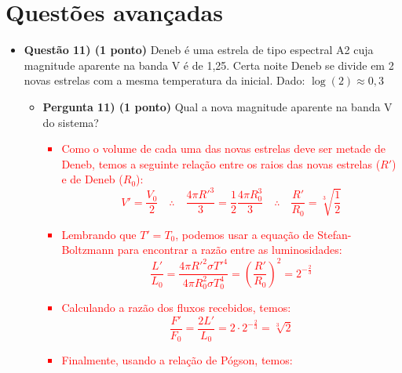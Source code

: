 \documentclass[a4paper, 12pt]{article}
\newcommand{\red}[1]{\textcolor{red}{#1}}
\begin{document}
    \section*{Questões avançadas}
        \begin{flushleft} \begin{itemize}
            \item \textbf{Questão 11) (1 ponto)} Deneb é uma estrela de tipo espectral A2 cuja magnitude aparente na banda V é de 1,25. Certa noite Deneb se divide em 2 novas estrelas com a mesma temperatura da inicial. \linebreak \linebreak Dado: \linebreak $\log(2) \approx 0,3$
                \begin{itemize}
                    \item \textbf{Pergunta 11) (1 ponto)} Qual a nova magnitude aparente na banda V do sistema?
                        \red{\begin{itemize}
                            \item Como o volume de cada uma das novas estrelas deve ser metade de Deneb, temos a seguinte relação entre os raios das novas estrelas ($R'$) e de Deneb ($R_0$):
                                \begin{equation*}
                                    V'=\frac{V_0}{2} \quad \therefore \quad \frac{4\pi R'^3}{3}=\frac{1}{2} \frac{4 \pi R_0^3}{3} \quad \therefore \quad \frac{R'}{R_0}=\sqrt[3]{\frac{1}{2}}
                                \end{equation*}
                            \item Lembrando que $T'=T_0$, podemos usar a equação de Stefan-Boltzmann para encontrar a razão entre as luminosidades:
                                \begin{equation*}
                                    \frac{L'}{L_0}=\frac{4 \pi R'^2 \sigma T'^4}{4 \pi R_0^2 \sigma T_0^4}=\left(\frac{R'}{R_0}\right)^2=2^{-\frac{2}{3}}
                                \end{equation*}
                            \item Calculando a razão dos fluxos recebidos, temos:
                                \begin{equation*}
                                    \frac{F'}{F_0}=\frac{2L'}{L_0}=2 \cdot 2^{-\frac{2}{3}}=\sqrt[3]{2}
                                \end{equation*}
                            \item Finalmente, usando a relação de Pógson, temos:

\end{itemize}}
\end{itemize}
\end{itemize}
\end{flushleft}
\end{document}
